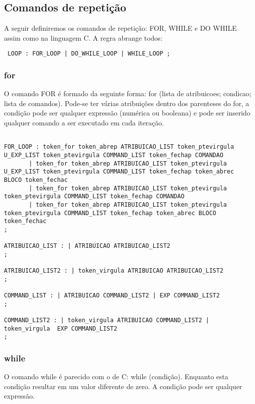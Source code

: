 \documentclass[a4paper,10pt]{article}
\begin{document}
\subsection{Comandos de repetição}
A seguir definiremos os comandos de repetição: FOR, WHILE e DO WHILE assim como na linguagem C. A regra abrange todos:
\begin{verbatim}
 LOOP : FOR_LOOP | DO_WHILE_LOOP | WHILE_LOOP ;
\end{verbatim}

\subsubsection{for}

O comando FOR é formado da seguinte forma: for (lista de atribuicoes; condicao; lista de comandos). Pode-se ter várias atribuições dentro dos parenteses do for,
a condição pode ser qualquer expressão (numérica ou booleana) e pode ser inserido qualquer comando a ser executado em cada iteração.

\begin{verbatim}

FOR_LOOP : token_for token_abrep ATRIBUICAO_LIST token_ptevirgula U_EXP_LIST token_ptevirgula COMMAND_LIST token_fechap COMANDAO
	   | token_for token_abrep ATRIBUICAO_LIST token_ptevirgula U_EXP_LIST token_ptevirgula COMMAND_LIST token_fechap token_abrec BLOCO token_fechac
	   | token_for token_abrep ATRIBUICAO_LIST token_ptevirgula token_ptevirgula COMMAND_LIST token_fechap COMANDAO
	   | token_for token_abrep ATRIBUICAO_LIST token_ptevirgula token_ptevirgula COMMAND_LIST token_fechap token_abrec BLOCO token_fechac
;

ATRIBUICAO_LIST : | ATRIBUICAO ATRIBUICAO_LIST2
;

ATRIBUICAO_LIST2 : | token_virgula ATRIBUICAO ATRIBUICAO_LIST2
;

COMMAND_LIST : | ATRIBUICAO COMMAND_LIST2 | EXP COMMAND_LIST2
;

COMMAND_LIST2 : | token_virgula ATRIBUICAO COMMAND_LIST2 | token_virgula  EXP COMMAND_LIST2
;

\end{verbatim}

\subsubsection{while}

O comando while é parecido com o de C: while (condição). Enquanto esta condição resultar em um valor diferente de zero. A condição pode ser qualquer expressão.
\end{document}
